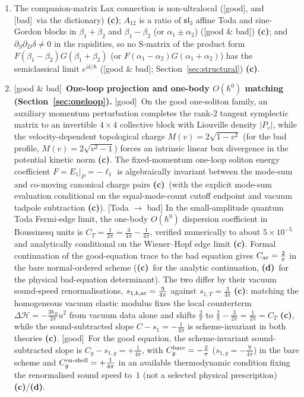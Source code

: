 \documentclass[11pt,a4paper]{article}
\newcommand{\lab}[1]{{\normalfont\sffamily\footnotesize\bfseries(#1)}}
\newcommand{\Lc}{\lab{c}}
\newcommand{\Ld}{\lab{d}}
\newcommand{\eqtag}[2]{{\normalfont\sffamily\footnotesize\textcolor{#1}{[#2]}}}
\newcommand{\Good}{\eqtag{teal!70!black}{good}}
\newcommand{\Bad}{\eqtag{red!60!black}{bad}}
\newcommand{\Both}{\eqtag{violet!70!black}{good \& bad}}
\newcommand{\hb}{\hbar}
\theoremstyle{remark}
\begin{document}
\begin{enumerate}
\item The companion-matrix Lax connection is non-ultralocal (\Good, and \Bad\ via the dictionary) \Lc; $A_{12}$ is a ratio of $\mathfrak{sl}_3$ affine Toda and sine-Gordon blocks in $\beta_1+\beta_2$ and $\beta_1-\beta_2$ (or $\alpha_1\pm\alpha_2$) (\Both) \Lc; and $\partial_S\partial_D\delta\neq0$ in the rapidities, so no S-matrix of the product form $F(\beta_1-\beta_2)G(\beta_1+\beta_2)$ (or $F(\alpha_1-\alpha_2)G(\alpha_1+\alpha_2)$) has the semiclassical limit $e^{i\delta/\hb}$ (\Both; Section~\ref{sec:structural}) \Lc.
\item \Both\ \textbf{One-loop projection and one-body $O(\hb^0)$ matching (Section~\ref{sec:oneloop}).} \Good\ On the good one-soliton family, an auxiliary momentum perturbation completes the rank-2 tangent symplectic matrix to an invertible $4\times4$ collective block with Liouville density $|P_v|$, while the velocity-dependent topological charge $M(v)=2\sqrt{1-v^2}$ (for the bad profile, $M(v)=2\sqrt{v^2-1}$) forces an intrinsic linear box divergence in the potential kinetic norm \Lc. The fixed-momentum one-loop soliton energy coefficient $F=E_1|_P=-\ell_1$ is algebraically invariant between the mode-sum and co-moving canonical charge pairs \Lc\ (with the explicit mode-sum evaluation conditional on the equal-mode-count cutoff endpoint and vacuum tadpole subtraction \Lc). \eqtag{red!60!black}{Toda $\to$ bad} In the small-amplitude quantum Toda Fermi-edge limit, the one-body $O(\hb^0)$ dispersion coefficient in Boussinesq units is $C_T=\tfrac1{2\pi}=\tfrac3{4\pi}-\tfrac1{4\pi}$, verified numerically to about $5\times10^{-5}$ and analytically conditional on the Wiener--Hopf edge limit \Lc. Formal continuation of the good-equation trace to the bad equation gives $C_{\rm ac}=\tfrac2\pi$ in the bare normal-ordered scheme (\Lc\ for the analytic continuation, \Ld\ for the physical bad-equation determinant). The two differ by their vacuum sound-speed renormalisations, $s_{1,b,{\rm ac}}=\tfrac9{4\pi}$ against $s_{1,T}=\tfrac3{4\pi}$ \Lc: matching the homogeneous vacuum elastic modulus fixes the local counterterm $\Delta\mathcal H=-\tfrac{3\hb_B}{2\pi}u^2$ from vacuum data alone and shifts $\tfrac2\pi$ to $\tfrac2\pi-\tfrac3{2\pi}=\tfrac1{2\pi}=C_T$ \Lc, while the sound-subtracted slope $C-s_1=-\tfrac1{4\pi}$ is scheme-invariant in both theories \Lc. \Good\ For the good equation, the scheme-invariant sound-subtracted slope is $C_g-s_{1,g}=+\tfrac1{4\pi}$, with $C_g^{\rm bare}=-\tfrac2\pi$ ($s_{1,g}=-\tfrac9{4\pi}$) in the bare scheme and $C_g^{\rm on\text{-}shell}=+\tfrac1{4\pi}$ in an available thermodynamic condition fixing the renormalised sound speed to~$1$ (not a selected physical prescription) \Lc/\Ld.

\end{enumerate}
\end{document}
